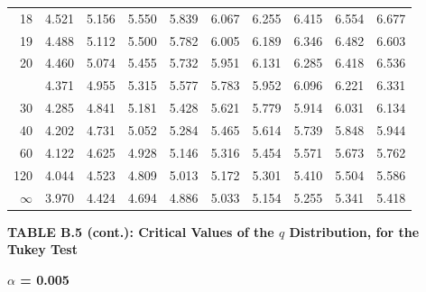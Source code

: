 \documentclass[10pt]{article}
\begin{document}
\begin{longtable}{@{}r!{\vrule width 0.8pt\hspace{0.55em}}rrrrrrrrr@{}}
18 & 4.521 & 5.156 & 5.550 & 5.839 & 6.067 & 6.255 & 6.415 & 6.554 & 6.677 \\
19 & 4.488 & 5.112 & 5.500 & 5.782 & 6.005 & 6.189 & 6.346 & 6.482 & 6.603 \\
20 & 4.460 & 5.074 & 5.455 & 5.732 & 5.951 & 6.131 & 6.285 & 6.418 & 6.536 \\
 & 4.371 & 4.955 & 5.315 & 5.577 & 5.783 & 5.952 & 6.096 & 6.221 & 6.331 \\
30 & 4.285 & 4.841 & 5.181 & 5.428 & 5.621 & 5.779 & 5.914 & 6.031 & 6.134 \\
40 & 4.202 & 4.731 & 5.052 & 5.284 & 5.465 & 5.614 & 5.739 & 5.848 & 5.944 \\
60 & 4.122 & 4.625 & 4.928 & 5.146 & 5.316 & 5.454 & 5.571 & 5.673 & 5.762 \\
120 & 4.044 & 4.523 & 4.809 & 5.013 & 5.172 & 5.301 & 5.410 & 5.504 & 5.586 \\
\addlinespace[0.30em]
$\infty$ & 3.970 & 4.424 & 4.694 & 4.886 & 5.033 & 5.154 & 5.255 & 5.341 & 5.418 \\
\end{longtable}
\newpage
\thispagestyle{empty}
\begin{center}
{\large\bfseries TABLE B.5 (cont.): Critical Values of the $q$ Distribution, for the Tukey Test\par}
\end{center}
{\large\bfseries $\alpha$ = 0.005\par}
\vspace{0.45em}
\small
\end{document}
